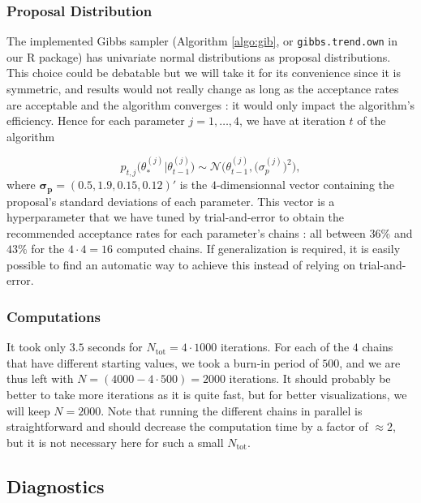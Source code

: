 \subsubsection*{Proposal Distribution}


The implemented Gibbs sampler (Algorithm \ref{algo:gib}, or \texttt{gibbs.trend.own} in our R package) has univariate normal distributions as proposal distributions. This choice could be debatable but we will take it for its convenience since it is symmetric, and results would not really change as long as the acceptance rates are acceptable and the algorithm converges : it would only impact the algorithm's efficiency. Hence for each parameter $j=1,\ldots,4$, we have at iteration $t$ of the algorithm

\begin{equation}
p_{t,j}\Big(\theta^{(j)}_*|\theta^{(j)}_{t-1}\Big) \sim \mathcal{N}\Big(\theta^{(j)}_{t-1},\big(\sigma^{(j)}_p\big)^2 \Big),
\end{equation}
where $\boldsymbol{\sigma_p}=(0.5, 1.9, 0.15,0.12)'$ is the $4$-dimensionnal vector containing the proposal's standard deviations of each parameter. This vector is a hyperparameter that we have tuned by trial-and-error to obtain the recommended acceptance rates for each parameter's chains : all between $36\%$ and $43\%$ for the $4\cdot 4=16$ computed chains. If generalization is required, it is easily possible to find an automatic way to achieve this instead of relying on trial-and-error. 


\subsubsection*{Computations} 

It took only $3.5$ seconds for $N_{\text{tot}}=4\cdot 1000$ iterations. For each of the $4$ chains that have different starting values, we took a burn-in period of $500$, and we are thus left with $N=(4000-4\cdot 500)=2000$ iterations. It should probably be better to take more iterations as it is quite fast, but for better visualizations, we will keep $N=2000$.
Note that running the different chains in parallel is straightforward and should decrease the computation time by a factor of $\approx 2$, but it is not necessary here for such a small $N_{\text{tot}}$.
 
 
\subsection{Diagnostics}


